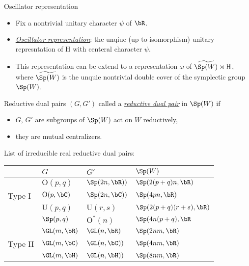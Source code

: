 \documentclass[final,hyperref={pdfpagelabels=false}]{beamer} %
\def\emph#1{{\em \underline{#1}}}
\begin{document}
\begin{frame}
\begin{columns}[t]
\begin{column}{.48\linewidth}
\begin{block}{Oscillator representation}
\begin{itemize}
        \item Fix a nontrivial unitary character $\psi$ of $\bR$. 
        \item \emph{Oscillator representation}: the unqiue (up to isomorphism) unitary represntation of $\mathrm{H}$ with centeral character $\psi$.
        \item This representation can be extend to a representation $\omega$ of 
          $\widetilde{\Sp(W)}\rtimes \mathrm{H}$, where
          $\widetilde{\Sp(W)}$ is  the unquie nontrivial double cover of the symplectic group $\Sp(W)$.
        \end{itemize}
      \end{block}
      \vfill
      \begin{block}{Reductive dual pairs}
        $(G,G')$ called a \emph{reductive dual pair} in $\Sp(W)$ if
        \begin{itemize}
        \item $G$, $G'$  are subgroups of $\Sp(W)$ act on $W$ reductively,
        \item they are mutual centralizers.
        \end{itemize}
        List of irreducible real reductive dual pairs:
       \begin{center}\small
        \begin{tabular}{ l |lll }
           & $G$ & $G'$ & $\Sp(W)$\\
          \hline
           & $\mathrm{O}(p,q)$ & $\Sp(2n,\bR))$ &$\Sp(2(p+q)n,\bR)$\\
           Type I & $\mathrm{O}(p,\bC)$ & $\Sp(2n,\bC))$ &$\Sp(4pn,\bR)$\\
          & $\mathrm{U}(p,q)$ & $\mathrm{U}(r,s)$ & $\Sp(2(p+q)(r+s),\bR)$\\ 
          & $\Sp(p,q)$& $\mathrm{O}^*(n)$ & $\Sp(4n(p+q),\bR$\\
          \hline
          &$\GL(m,\bR)$ & $\GL(n,\bR)$& $\Sp(2nm,\bR)$\\
         Type II &$\GL(m,\bC)$& $\GL(n,\bC))$& $\Sp(4nm,\bR)$ \\
          &$\GL(m,\bH)$& $\GL(n,\bH))$& $\Sp(8nm,\bR)$
        \end{tabular}
      \end{center}
    \end{block}


\end{column}
\end{columns}
\end{frame}
\end{document}
